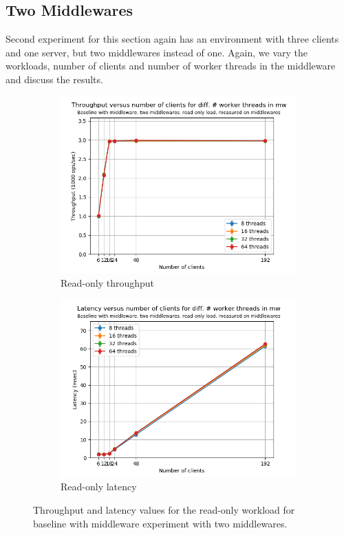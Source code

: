 \documentclass[11pt,a4paper]{article}
\begin{document}
\subsection{Two Middlewares} \label{sec:mwb2}
Second experiment for this section again has an environment with three clients and one server, but two middlewares instead of one. Again, we vary the workloads, number of clients and number of worker threads in the middleware and discuss the results.

\begin{figure}[h]
\centering
\begin{subfigure}{.5\textwidth}
  \centering
  \includegraphics[width=1.0\linewidth,trim={0px 0px 0px 0px},clip]{img/plot/mwb2-ro-tp_mw.png}
  \caption{Read-only throughput}
  \label{fig:mwb2-ro-tp_mw}
\end{subfigure}%
\begin{subfigure}{.5\textwidth}
  \centering
  \includegraphics[width=1.0\linewidth,trim={0px 0px 0px 0px},clip]{img/plot/mwb2-ro-lat_mw}
  \caption{Read-only latency}
  \label{fig:mwb2-ro-lat_mw}
\end{subfigure}
\caption{Throughput and latency values for the read-only workload for baseline with middleware experiment with two middlewares.}
\label{fig:mwb2-ro_mw}
\end{figure}
\end{document}

